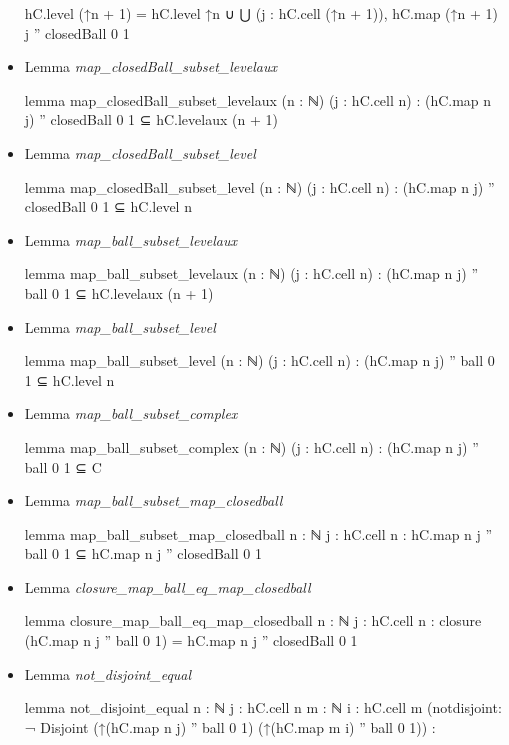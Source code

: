 \documentclass[colorinlistoftodos]{article}
\begin{document}
\begin{itemize}
\begin{leancode}
  hC.level (↑n + 1) = 
  hC.level ↑n ∪ ⋃ (j : hC.cell (↑n + 1)), hC.map (↑n + 1) j '' closedBall 0 1
\end{leancode}
  \item Lemma \emph{map\_closedBall\_subset\_levelaux}
\begin{leancode}
lemma map_closedBall_subset_levelaux (n : ℕ) (j : hC.cell n) : 
  (hC.map n j) '' closedBall 0 1 ⊆ hC.levelaux (n + 1)
\end{leancode}
  \item Lemma \emph{map\_closedBall\_subset\_level}
\begin{leancode}
lemma map_closedBall_subset_level (n : ℕ) (j : hC.cell n) : 
  (hC.map n j) '' closedBall 0 1 ⊆ hC.level n
\end{leancode}
  \item Lemma \emph{map\_ball\_subset\_levelaux}
\begin{leancode}
lemma map_ball_subset_levelaux (n : ℕ) (j : hC.cell n) : 
  (hC.map n j) '' ball 0 1 ⊆ hC.levelaux (n + 1)
\end{leancode}
  \item Lemma \emph{map\_ball\_subset\_level}
\begin{leancode}
lemma map_ball_subset_level (n : ℕ) (j : hC.cell n) : 
  (hC.map n j) '' ball 0 1 ⊆ hC.level n
\end{leancode}
  \item Lemma \emph{map\_ball\_subset\_complex}
\begin{leancode}
lemma map_ball_subset_complex (n : ℕ) (j : hC.cell n) : 
  (hC.map n j) '' ball 0 1 ⊆ C
\end{leancode}
  \item Lemma \emph{map\_ball\_subset\_map\_closedball}
\begin{leancode}
lemma map_ball_subset_map_closedball {n : ℕ} {j : hC.cell n} :
  hC.map n j '' ball 0 1 ⊆ hC.map n j '' closedBall 0 1
\end{leancode}
  \item Lemma \emph{closure\_map\_ball\_eq\_map\_closedball}
\begin{leancode}
lemma closure_map_ball_eq_map_closedball {n : ℕ} {j : hC.cell n} : 
  closure (hC.map n j '' ball 0 1) = hC.map n j '' closedBall 0 1
\end{leancode}
  \item Lemma \emph{not\_disjoint\_equal}
\begin{leancode}
lemma not_disjoint_equal {n : ℕ} {j : hC.cell n} {m : ℕ} {i : hC.cell m}
(notdisjoint: ¬ Disjoint (↑(hC.map n j) '' ball 0 1) (↑(hC.map m i) '' ball 0 1)) :

\end{leancode}
\end{itemize}
\end{document}
